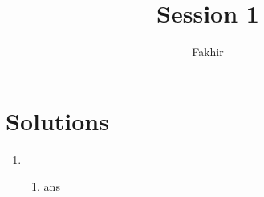 \documentclass[]{article}
\title{Session 1}
\author{Fakhir}
\begin{document}
\maketitle

\section*{Solutions}

\begin{enumerate}
	\item \begin{enumerate}
		\item ans
	\end{enumerate}
\end{enumerate}
\end{document}

